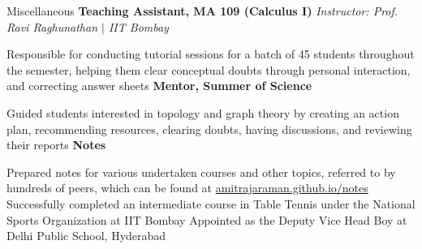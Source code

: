 
\begin{rubric}{Miscellaneous}
    \entry*[2020] \textbf{Teaching Assistant, MA 109 (Calculus I)} \hfill \emph{Instructor: Prof. Ravi Raghunathan $\mid$ IIT Bombay}
	    
	    Responsible for conducting tutorial sessions for a batch of 45 students throughout the semester, helping them clear conceptual doubts through personal interaction, and correcting answer sheets
	\entry*[2021--2022] \textbf{Mentor, Summer of Science}

		Guided students interested in topology and graph theory by creating an action plan, recommending resources, clearing doubts, having discussions, and reviewing their reports
	\entry*[2020--2022] \textbf{Notes}

		Prepared notes for various undertaken courses and other topics, referred to by hundreds of peers, which can be found at \href{https://amitrajaraman.github.io/notes}{amitrajaraman.github.io/notes}
	\entry*[2019] Successfully completed an intermediate course in Table Tennis under the National Sports Organization at IIT Bombay	
	\entry*[2016] Appointed as the Deputy Vice Head Boy at Delhi Public School, Hyderabad


\end{rubric}